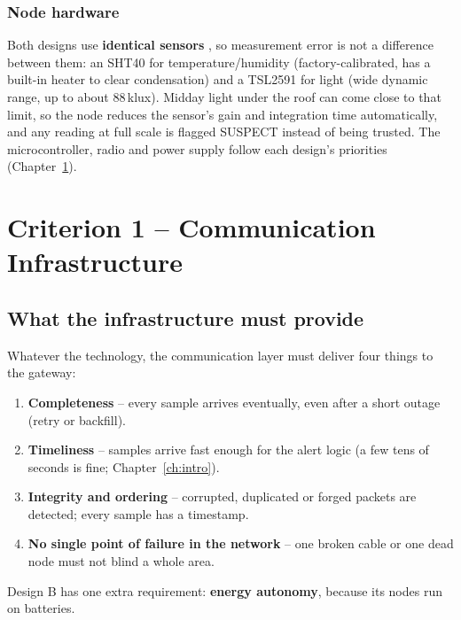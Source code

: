 \documentclass[11pt,a4paper]{report}
\begin{document}
\subsection{Node hardware}
Both designs use \textbf{identical sensors} \cite{ds}, so measurement error is not a difference between them: an SHT40 for temperature/humidity (factory-calibrated, has a built-in heater to clear condensation) and a TSL2591 for light (wide dynamic range, up to about 88\,klux). Midday light under the roof can come close to that limit, so the node reduces the sensor's gain and integration time automatically, and any reading at full scale is flagged SUSPECT instead of being trusted. The microcontroller, radio and power supply follow each design's priorities (Chapter~\ref{ch:comm}).

\chapter{Criterion 1 -- Communication Infrastructure}\label{ch:comm}

\section{What the infrastructure must provide}
Whatever the technology, the communication layer must deliver four things to the gateway:
\begin{enumerate}[noitemsep]
  \item \textbf{Completeness} -- every sample arrives eventually, even after a short outage (retry or backfill).
  \item \textbf{Timeliness} -- samples arrive fast enough for the alert logic (a few tens of seconds is fine; Chapter~\ref{ch:intro}).
  \item \textbf{Integrity and ordering} -- corrupted, duplicated or forged packets are detected; every sample has a timestamp.
  \item \textbf{No single point of failure in the network} -- one broken cable or one dead node must not blind a whole area.
\end{enumerate}
Design B has one extra requirement: \textbf{energy autonomy}, because its nodes run on batteries.
\end{document}
